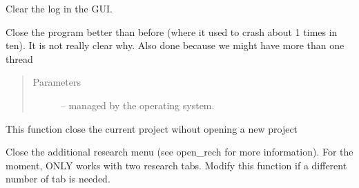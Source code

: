 \documentclass[letterpaper,10pt,english]{sphinxmanual}
\begin{document}
\begin{fulllineitems}
\begin{fulllineitems}
\end{fulllineitems}


\begin{fulllineitems}
\label{\detokenize{index:src_GUI.Main_windows_1.MainWindows.clear_log}}
Clear the log in the GUI.

\end{fulllineitems}


\begin{fulllineitems}
\label{\detokenize{index:src_GUI.Main_windows_1.MainWindows.closeEvent}}
Close the program better than before (where it used to crash about 1 times in ten). It is not really clear why.
Also done because we might have more than one thread
\begin{quote}\begin{description}
\item[{Parameters}] \leavevmode
{} -- managed by the operating system.

\end{description}\end{quote}

\end{fulllineitems}


\begin{fulllineitems}
\label{\detokenize{index:src_GUI.Main_windows_1.MainWindows.close_project}}
This function close the current project wihout opening a new project

\end{fulllineitems}


\begin{fulllineitems}
\label{\detokenize{index:src_GUI.Main_windows_1.MainWindows.close_rech}}
Close the additional research menu (see open\_rech for more information). For the moment, ONLY works with
two research tabs. Modify this function if a different number of tab is needed.


\end{fulllineitems}
\end{fulllineitems}
\end{document}
